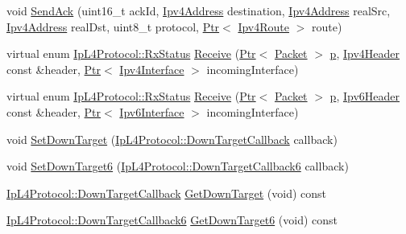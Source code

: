 \begin{DoxyCompactItemize}
\item 
void \hyperlink{classns3_1_1dsr_1_1DsrRouting_af60f582ca5ce9871a1f582f052511a38}{Send\+Ack} (uint16\+\_\+t ack\+Id, \hyperlink{classns3_1_1Ipv4Address}{Ipv4\+Address} destination, \hyperlink{classns3_1_1Ipv4Address}{Ipv4\+Address} real\+Src, \hyperlink{classns3_1_1Ipv4Address}{Ipv4\+Address} real\+Dst, uint8\+\_\+t protocol, \hyperlink{classns3_1_1Ptr}{Ptr}$<$ \hyperlink{classns3_1_1Ipv4Route}{Ipv4\+Route} $>$ route)
\item 
virtual enum \hyperlink{classns3_1_1IpL4Protocol_afd3744c89902fff232e2fd45f558c80e}{Ip\+L4\+Protocol\+::\+Rx\+Status} \hyperlink{classns3_1_1dsr_1_1DsrRouting_a4908cdae502d8bdca8a244d4420311e6}{Receive} (\hyperlink{classns3_1_1Ptr}{Ptr}$<$ \hyperlink{classns3_1_1Packet}{Packet} $>$ \hyperlink{lte__link__budget__x2__handover__measures_8m_ac9de518908a968428863f829398a4e62}{p}, \hyperlink{classns3_1_1Ipv4Header}{Ipv4\+Header} const \&header, \hyperlink{classns3_1_1Ptr}{Ptr}$<$ \hyperlink{classns3_1_1Ipv4Interface}{Ipv4\+Interface} $>$ incoming\+Interface)
\item 
virtual enum \hyperlink{classns3_1_1IpL4Protocol_afd3744c89902fff232e2fd45f558c80e}{Ip\+L4\+Protocol\+::\+Rx\+Status} \hyperlink{classns3_1_1dsr_1_1DsrRouting_aa0fd777071685501dfcf74f4a5102608}{Receive} (\hyperlink{classns3_1_1Ptr}{Ptr}$<$ \hyperlink{classns3_1_1Packet}{Packet} $>$ \hyperlink{lte__link__budget__x2__handover__measures_8m_ac9de518908a968428863f829398a4e62}{p}, \hyperlink{classns3_1_1Ipv6Header}{Ipv6\+Header} const \&header, \hyperlink{classns3_1_1Ptr}{Ptr}$<$ \hyperlink{classns3_1_1Ipv6Interface}{Ipv6\+Interface} $>$ incoming\+Interface)
\item 
void \hyperlink{classns3_1_1dsr_1_1DsrRouting_a3831a9cac1a24f243f81e770ae4b9587}{Set\+Down\+Target} (\hyperlink{classns3_1_1IpL4Protocol_ae3ba76c0a48fbaa90529c528a15f12b6}{Ip\+L4\+Protocol\+::\+Down\+Target\+Callback} callback)
\item 
void \hyperlink{classns3_1_1dsr_1_1DsrRouting_a184a0f635df5cf3dac67c3eb97452dc8}{Set\+Down\+Target6} (\hyperlink{classns3_1_1IpL4Protocol_a039f3d1883632ab922fa958fc9ecd97f}{Ip\+L4\+Protocol\+::\+Down\+Target\+Callback6} callback)
\item 
\hyperlink{classns3_1_1IpL4Protocol_ae3ba76c0a48fbaa90529c528a15f12b6}{Ip\+L4\+Protocol\+::\+Down\+Target\+Callback} \hyperlink{classns3_1_1dsr_1_1DsrRouting_a62358ed8bc8d3df85af845522e84ad1a}{Get\+Down\+Target} (void) const 
\item 
\hyperlink{classns3_1_1IpL4Protocol_a039f3d1883632ab922fa958fc9ecd97f}{Ip\+L4\+Protocol\+::\+Down\+Target\+Callback6} \hyperlink{classns3_1_1dsr_1_1DsrRouting_acee265284cbac4dcf7764305ee7b6c99}{Get\+Down\+Target6} (void) const 

\end{DoxyCompactItemize}
